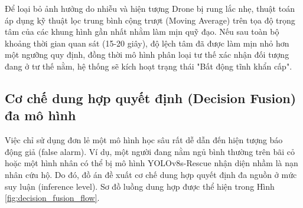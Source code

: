 Để loại bỏ ảnh hưởng do nhiễu và hiện tượng Drone bị rung lắc nhẹ, thuật toán áp dụng kỹ thuật lọc trung bình cộng trượt (Moving Average) trên tọa độ trọng tâm của các khung hình gần nhất nhằm làm mịn quỹ đạo. Nếu sau toàn bộ khoảng thời gian quan sát (15-20 giây), độ lệch tâm đã được làm mịn nhỏ hơn một ngưỡng quy định, đồng thời mô hình phân loại tư thế xác nhận đối tượng đang ở tư thế nằm, hệ thống sẽ kích hoạt trạng thái "Bất động tĩnh khẩn cấp".

\subsection{Cơ chế dung hợp quyết định (Decision Fusion) đa mô hình}

Việc chỉ sử dụng đơn lẻ một mô hình học sâu rất dễ dẫn đến hiện tượng báo động giả (false alarm). Ví dụ, một người đang nằm ngủ bình thường trên bãi cỏ hoặc một hình nhân có thể bị mô hình YOLOv8s-Rescue nhận diện nhầm là nạn nhân cứu hộ. Do đó, đồ án đề xuất cơ chế dung hợp quyết định đa nguồn ở mức suy luận (inference level). Sơ đồ luồng dung hợp được thể hiện trong Hình \ref{fig:decision_fusion_flow}.

